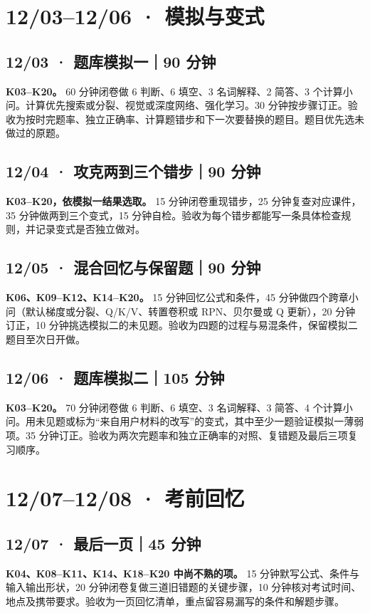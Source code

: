 \documentclass[UTF8,a4paper,11pt]{ctexart}
\begin{document}
\section{12/03–12/06 · 模拟与变式}
\subsection{12/03 · 题库模拟一｜90 分钟}
\textbf{K03–K20。} 60 分钟闭卷做 6 判断、6 填空、3 名词解释、2 简答、3 个计算小问。计算优先搜索或分裂、视觉或深度网络、强化学习。30 分钟按步骤订正。验收为按时完题率、独立正确率、计算题错步和下一次要替换的题目。题目优先选未做过的原题。

\subsection{12/04 · 攻克两到三个错步｜90 分钟}
\textbf{K03–K20，依模拟一结果选取。} 15 分钟闭卷重现错步，25 分钟复查对应课件，35 分钟做两到三个变式，15 分钟自检。验收为每个错步都能写一条具体检查规则，并记录变式是否独立做对。

\subsection{12/05 · 混合回忆与保留题｜90 分钟}
\textbf{K06、K09–K12、K14–K20。} 15 分钟回忆公式和条件，45 分钟做四个跨章小问（默认梯度或分裂、Q/K/V、转置卷积或 RPN、贝尔曼或 Q 更新），20 分钟订正，10 分钟挑选模拟二的未见题。验收为四题的过程与易混条件，保留模拟二题目至次日开做。

\subsection{12/06 · 题库模拟二｜105 分钟}
\textbf{K03–K20。} 70 分钟闭卷做 6 判断、6 填空、3 名词解释、3 简答、4 个计算小问。用未见题或标为“来自用户材料的改写”的变式，其中至少一题验证模拟一薄弱项。35 分钟订正。验收为两次完题率和独立正确率的对照、复错题及最后三项复习顺序。

\section{12/07–12/08 · 考前回忆}
\subsection{12/07 · 最后一页｜45 分钟}
\textbf{K04、K08–K11、K14、K18–K20 中尚不熟的项。} 15 分钟默写公式、条件与输入输出形状，20 分钟闭卷复做三道旧错题的关键步骤，10 分钟核对考试时间、地点及携带要求。验收为一页回忆清单，重点留容易漏写的条件和解题步骤。
\end{document}
